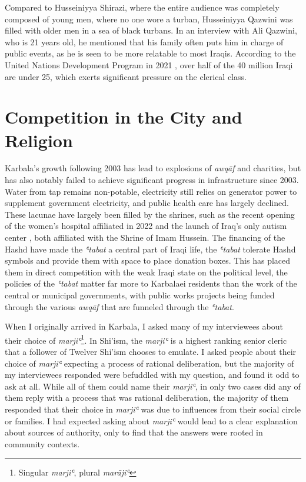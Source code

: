 Compared to Husseiniyya Shirazi, where the entire audience was completely composed of young men, where no one wore a turban, Husseiniyya Qazwini was filled with older men in a sea of black turbans. In an interview with Ali Qazwini, who is 21 years old, he mentioned that his family often puts him in charge of public events, as he is seen to be more relatable to most Iraqis. According to the United Nations Development Program in 2021 \cite{undp_youth_2021}, over half of the 40 million Iraqi are under 25, which exerts significant pressure on the clerical class. 

\section{Competition in the City and Religion}
Karbala's growth following 2003 has lead to explosions of \emph{awqāf} and charities, but has also notably failed to achieve significant progress in infrastructure since 2003. Water from tap remains non-potable, electricity still relies on generator power to supplement government electricity, and public health care has largely declined. These lacunae have largely been filled by the shrines, such as the recent opening of the women's hospital affiliated in 2022 and the launch of Iraq's only autism center \cite{imam_hussain_holy_shrine_imam_2020}, both affiliated with the Shrine of Imam Hussein. The financing of the Hashd have made the \emph{ʿtabat} a central part of Iraqi life, the \emph{ʿtabat} tolerate Hashd symbols and provide them with space to place donation boxes. This has placed them in direct competition with the weak Iraqi state on the political level, the policies of the \emph{ʿtabat} matter far more to Karbalaei residents than the work of the central or municipal governments, with public works projects being funded through the various \emph{awqāf} that are funneled through the \emph{ʿtabat}. 

When I originally arrived in Karbala, I asked many of my interviewees about their choice of \emph{marjiʿ}\footnote{Singular \emph{marjiʿ}, plural \emph{marājiʿ}}. In Shi'ism, the \emph{marjiʿ} is a highest ranking senior cleric that a follower of Twelver Shi'ism chooses to emulate. I asked people about their choice of \emph{marjiʿ} expecting a process of rational deliberation, but the majority of my interviewees responded were befuddled with my question, and found it odd to ask at all. While all of them could name their \emph{marjiʿ}, in only two cases did any of them reply with a process that was rational deliberation, the majority of them responded that their choice in \emph{marjiʿ} was due to influences from their social circle or families. I had expected asking about \emph{marjiʿ} would lead to a clear explanation about sources of authority, only to find that the answers were rooted in community contexts.

